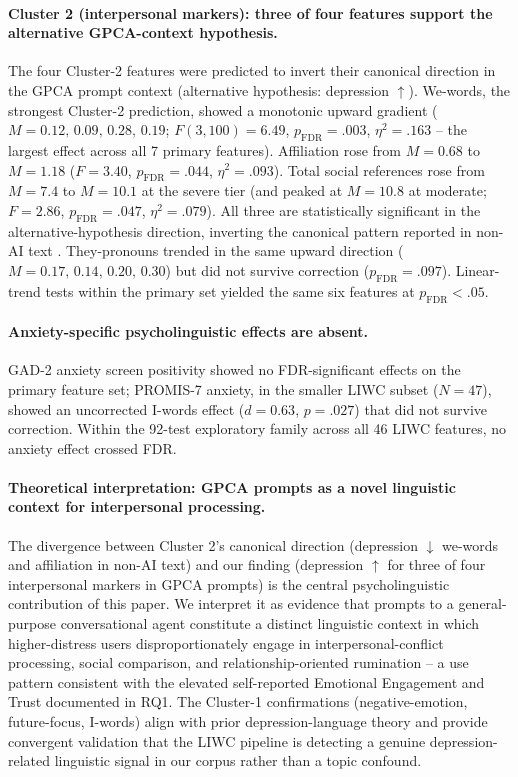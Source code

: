 \documentclass[letterpaper]{article}
\begin{document}
\paragraph{Cluster 2 (interpersonal markers): three of four features support the alternative GPCA-context hypothesis.} The four Cluster-2 features were predicted to invert their canonical direction in the GPCA prompt context (alternative hypothesis: depression $\uparrow$). We-words, the strongest Cluster-2 prediction, showed a monotonic upward gradient ($M=0.12,\,0.09,\,0.28,\,0.19$; $F(3,100)=6.49$, $p_{\mathrm{FDR}}=.003$, $\eta^2=.163$ -- the largest effect across all 7 primary features). Affiliation rose from $M=0.68$ to $M=1.18$ ($F=3.40$, $p_{\mathrm{FDR}}=.044$, $\eta^2=.093$). Total social references rose from $M=7.4$ to $M=10.1$ at the severe tier (and peaked at $M=10.8$ at moderate; $F=2.86$, $p_{\mathrm{FDR}}=.047$, $\eta^2=.079$). All three are statistically significant in the alternative-hypothesis direction, inverting the canonical pattern reported in non-AI text \citep{tackman2019pronouns,guntuku2022loneliness}. They-pronouns trended in the same upward direction ($M=0.17,\,0.14,\,0.20,\,0.30$) but did not survive correction ($p_{\mathrm{FDR}}=.097$). Linear-trend tests within the primary set yielded the same six features at $p_{\mathrm{FDR}}<.05$.

\paragraph{Anxiety-specific psycholinguistic effects are absent.} GAD-2 anxiety screen positivity showed no FDR-significant effects on the primary feature set; PROMIS-7 anxiety, in the smaller LIWC subset ($N=47$), showed an uncorrected I-words effect ($d=0.63$, $p=.027$) that did not survive correction. Within the 92-test exploratory family across all 46 LIWC features, no anxiety effect crossed FDR.

\paragraph{Theoretical interpretation: GPCA prompts as a novel linguistic context for interpersonal processing.} The divergence between Cluster 2's canonical direction (depression $\downarrow$ we-words and affiliation in non-AI text) and our finding (depression $\uparrow$ for three of four interpersonal markers in GPCA prompts) is the central psycholinguistic contribution of this paper. We interpret it as evidence that prompts to a general-purpose conversational agent constitute a distinct linguistic context in which higher-distress users disproportionately engage in interpersonal-conflict processing, social comparison, and relationship-oriented rumination -- a use pattern consistent with the elevated self-reported Emotional Engagement and Trust documented in RQ1. The Cluster-1 confirmations (negative-emotion, future-focus, I-words) align with prior depression-language theory and provide convergent validation that the LIWC pipeline is detecting a genuine depression-related linguistic signal in our corpus rather than a topic confound.
\end{document}
